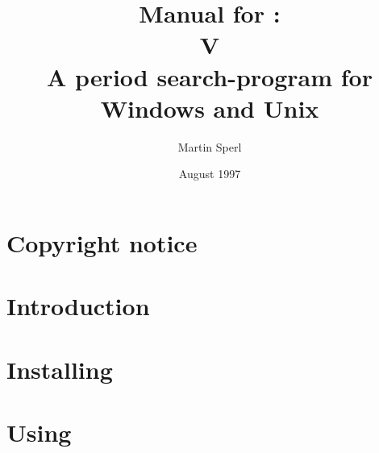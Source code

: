 \title{Manual for \periodname:\\
        V\version\\
        A period search-program for Windows and Unix}
\author{Martin Sperl}
\date{August 1997}

\normskip

\makeindex


\setcounter{secnumdepth}{4}
\setcounter{tocdepth}{4}


\maketitle
\cleardoublepage

\cleardoublepage
\pagestyle{fancyplain}

\myfoot{\thepage}{}{}
\tableofcontents
\cleardoublepage

\cleardoublepage
\chapter*{Copyright notice}%
\label{HELP_COPYRIGHT}

\cleardoublepage

\cleardoublepage
\chapter{Introduction}%
\label{HELP_INTRODUCTION}

\cleardoublepage

\cleardoublepage
\chapter{Installing \periodname}

\cleardoublepage

\cleardoublepage
\chapter{Using \periodname}%
\label{HELP_HOW_TO_USE}

\cleardoublepage

